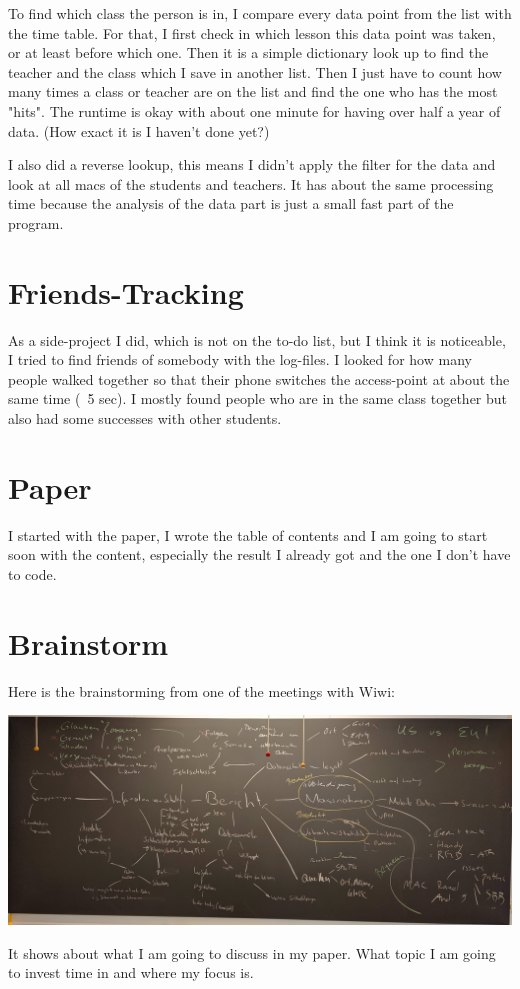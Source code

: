 \documentclass[paper=a4, fontsize=11pt]{article}
\begin{document}
To find which class the person is in, I compare every data point from the list with the time table. For that, I first check in which lesson this data point was taken, or at least before which one. Then it is a simple dictionary look up to find the teacher and the class which I save in another list. Then I just have to count how many times a class or teacher are on the list and find the one who has the most "hits". The runtime is okay with about one minute for having over half a year of data. (How exact it is I haven't done yet?) 

I also did a reverse lookup, this means I didn't apply the filter for the data and look at all macs of the students and teachers. It has about the same processing time because the analysis of the data part is just a small fast part of the program.

\section{Friends-Tracking}
As a side-project I did, which is not on the to-do list, but I think it is noticeable, I tried to find friends of somebody with the log-files. I looked for how many people walked together so that their phone switches the access-point at about the same time (~5 sec). I mostly found people who are in the same class together but also had some successes with other students.

\section{Paper}
I started with the paper, I wrote the table of contents and I am going to start soon with the content, especially the result I already got and the one I don't have to code.

\newpage
\section{Brainstorm}
Here is the brainstorming from one of the meetings with Wiwi:


\includegraphics[width=\textwidth]{brainstorming}

It shows about what I am going to discuss in my paper. What topic I am going to invest time in and where my focus is.
\end{document}
